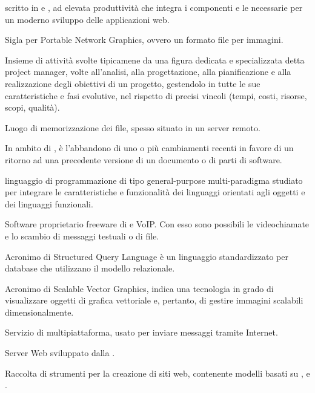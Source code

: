   scritto in  e , ad elevata produttivit\`a che integra i componenti e le  necessarie per un moderno sviluppo delle applicazioni web.

Sigla per Portable Network Graphics, ovvero un formato file per immagini.

Insieme di attività svolte tipicamene da una figura dedicata e specializzata detta project manager, volte all'analisi, alla progettazione, alla pianificazione e alla realizzazione degli obiettivi di un progetto, gestendolo in tutte le sue caratteristiche e fasi evolutive, nel rispetto di precisi vincoli (tempi, costi, risorse, scopi, qualità).
\clearpage

Luogo di memorizzazione dei file, spesso situato in un server remoto.

In ambito di , è l'abbandono di uno o più cambiamenti recenti in favore di un ritorno ad una precedente versione di un documento o di parti di software.
\clearpage

linguaggio di programmazione di tipo general-purpose multi-paradigma studiato per integrare le caratteristiche e funzionalit\`a dei linguaggi orientati agli oggetti e dei linguaggi funzionali.

Software proprietario freeware di  e VoIP. Con esso sono possibili le videochiamate e lo scambio di messaggi testuali o di file.

Acronimo di Structured Query Language \`e un linguaggio standardizzato per database che utilizzano il modello relazionale.

Acronimo di Scalable Vector Graphics, indica una tecnologia in grado di visualizzare oggetti di grafica vettoriale e, pertanto, di gestire immagini scalabili dimensionalmente.
\clearpage

Servizio di  multipiattaforma, usato per inviare messaggi tramite Internet.

Server Web  sviluppato dalla . 

Raccolta di strumenti per la creazione di siti web, contenente modelli basati su ,  e .
\clearpage

